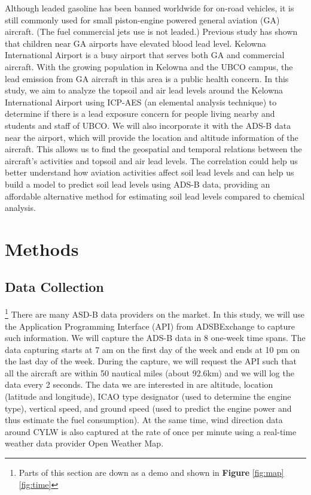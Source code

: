 \documentclass[12pt]{article}
\begin{document}
Although leaded gasoline has been banned worldwide for on-road vehicles, it is still commonly used for small piston-engine powered general aviation (GA) aircraft. (The fuel commercial jets use is not leaded.) Previous study has shown that children near GA airports have elevated blood lead level.\cite{miranda_geospatial_2011} \cite{zahran_leaded_2023} \cite{mills_lead_2022} \cite{zahran_effect_2017} Kelowna International Airport is a busy airport that serves both GA and commercial aircraft. With the growing population in Kelowna and the UBCO campus, the lead emission from GA aircraft in this area is a public health concern. In this study, we aim to analyze the topsoil and air lead levels around the Kelowna International Airport using ICP-AES (an elemental analysis technique) to determine if there is a lead exposure concern for people living nearby and students and staff of UBCO. We will also incorporate it with the ADS-B data near the airport, which will provide the location and altitude information of the aircraft. This allows us to find the geospatial and temporal relations between the aircraft's activities and topsoil and air lead levels. The correlation could help us better understand how aviation activities affect soil lead levels and can help us build a model to predict soil lead levels using ADS-B data, providing an affordable alternative method for estimating soil lead levels compared to chemical analysis.
\section{Methods}
\subsection{Data Collection}\footnote{Parts of this section are down as a demo and shown in \textbf{Figure} \ref{fig:map} \ref{fig:time}}
There are many ASD-B data providers on the market. In this study, we will use the Application Programming Interface (API) from ADSBExchange \cite{adsbexchange} to capture such information. We will capture the ADS-B data in 8 one-week time spans. The data capturing starts at 7 am on the first day of the week and ends at 10 pm on the last day of the week. During the capture, we will request the API such that all the aircraft are within 50 nautical miles (about 92.6km) and we will log the data every 2 seconds. The data we are interested in are altitude, location (latitude and longitude), ICAO type designator (used to determine the engine type), vertical speed, and ground speed (used to predict the engine power and thus estimate the fuel consumption). At the same time, wind direction data around CYLW is also captured at the rate of once per minute using a real-time weather data provider Open Weather Map. 
\end{document}
